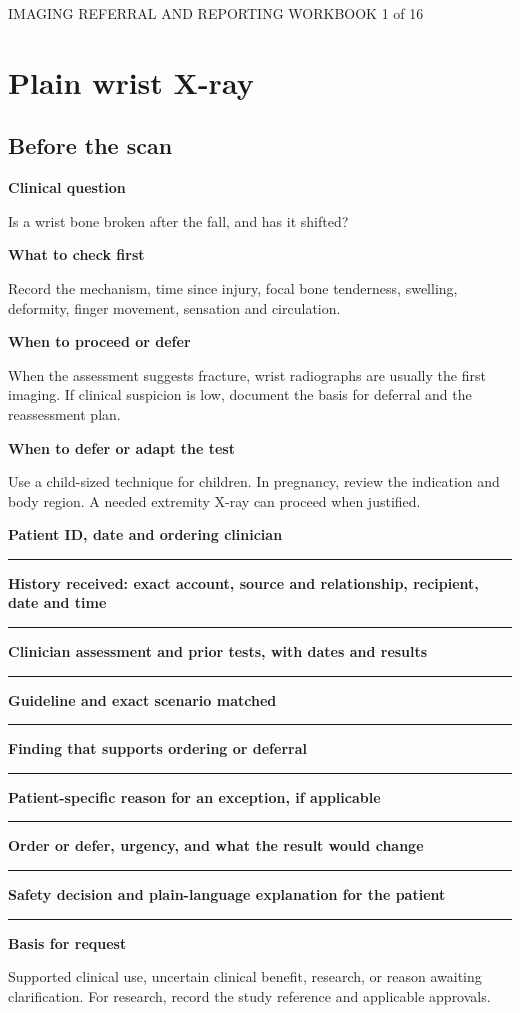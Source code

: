 \documentclass[11pt,a4paper]{article}
\newcommand{\record}[1]{\textbf{#1}\par\vspace{0.55\baselineskip}\hrule\vspace{0.35\baselineskip}}
\begin{document}
{\small IMAGING REFERRAL AND REPORTING WORKBOOK \hfill 1 of 16}

\section*{Plain wrist X-ray}

\subsection*{Before the scan}

\textbf{Clinical question}\par Is a wrist bone broken after the fall, and has it shifted?\par

\textbf{What to check first}\par Record the mechanism, time since injury, focal bone tenderness, swelling, deformity, finger movement, sensation and circulation.\par

\textbf{When to proceed or defer}\par When the assessment suggests fracture, wrist radiographs are usually the first imaging. If clinical suspicion is low, document the basis for deferral and the reassessment plan.\par

\textbf{When to defer or adapt the test}\par Use a child-sized technique for children. In pregnancy, review the indication and body region. A needed extremity X-ray can proceed when justified.\par

\record{Patient ID, date and ordering clinician}

\record{History received: exact account, source and relationship, recipient, date and time}

\record{Clinician assessment and prior tests, with dates and results}

\record{Guideline and exact scenario matched}

\record{Finding that supports ordering or deferral}

\record{Patient-specific reason for an exception, if applicable}

\record{Order or defer, urgency, and what the result would change}

\record{Safety decision and plain-language explanation for the patient}

\textbf{Basis for request}\par Supported clinical use, uncertain clinical benefit, research, or reason awaiting clarification. For research, record the study reference and applicable approvals.\par
\end{document}
